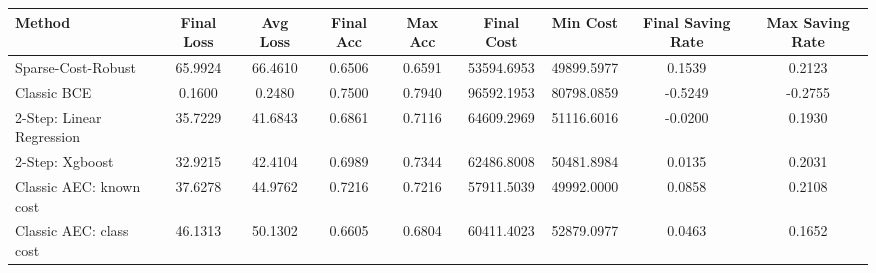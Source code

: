 \begin{tabular}{lcccccccc}
\toprule
Method & Final Loss & Avg Loss & Final Acc & Max Acc & Final Cost & Min Cost & Final Saving Rate & Max Saving Rate \\
\midrule
Sparse-Cost-Robust & 65.9924 & 66.4610 & 0.6506 & 0.6591 & 53594.6953 & 49899.5977 & 0.1539 & 0.2123 \\
Classic BCE & 0.1600 & 0.2480 & 0.7500 & 0.7940 & 96592.1953 & 80798.0859 & -0.5249 & -0.2755 \\
2-Step: Linear Regression & 35.7229 & 41.6843 & 0.6861 & 0.7116 & 64609.2969 & 51116.6016 & -0.0200 & 0.1930 \\
2-Step: Xgboost & 32.9215 & 42.4104 & 0.6989 & 0.7344 & 62486.8008 & 50481.8984 & 0.0135 & 0.2031 \\
Classic AEC: known cost & 37.6278 & 44.9762 & 0.7216 & 0.7216 & 57911.5039 & 49992.0000 & 0.0858 & 0.2108 \\
Classic AEC: class cost & 46.1313 & 50.1302 & 0.6605 & 0.6804 & 60411.4023 & 52879.0977 & 0.0463 & 0.1652 \\
\bottomrule
\end{tabular}
